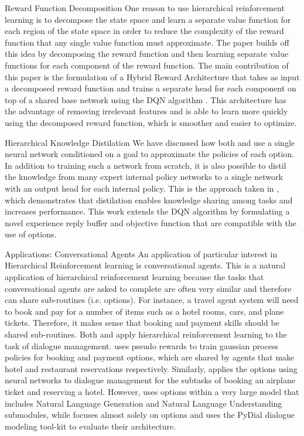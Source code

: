 \begin{subsection}{Reward Function Decomposition}
One reason to use hierarchical reinforcement learning is
to decompose the state space and learn a separate value function
for each region of the state space in order to reduce the complexity of the reward
function that any single value function must approximate. The paper
\cite{Seijen} builds off this idea
by decomposing the reward function and then learning separate value functions for
each component of the reward function. The main contribution of this paper is
the formulation of a Hybrid Reward Architecture that takes as input a decomposed
reward function and trains a separate head for each component on top of a shared base
network using the DQN algorithm \cite{Mnih}. This architecture has the advantage of
removing irrelevant features and is able to learn more quickly using the decomposed
reward function, which is smoother and easier to optimize.
\end{subsection}

\begin{subsection}{Hierarchical Knowledge Distilation}
We have discussed how both \cite{Florensa} and \cite{Tejas}
use a single neural network conditioned on a goal to approximate the policies of each option.
In addition to training such a network from scratch, it is also possible to distil
the knowledge from many expert internal policy networks to a single network with an
output head for each internal policy. This is the approach taken in \cite{Tessler}, which
demonstrates that distilation enables knowledge sharing among tasks and increases performance.
This work extends the DQN algorithm by formulating a novel
experience reply buffer and objective function that are compatible with the use
of options.
\end{subsection}

\begin{subsection}{Applications: Conversational Agents}
An application of particular interest in Hierarchical Reinforcement learning
is conversational agents. This is a natural application of hierarchical
reinforcement learning because the tasks that conversational agents are asked
to complete are often very similar and therefore can share sub-routines
(i.e. options). For instance, a travel agent system will need to book
and pay for a number of items such as a hotel rooms, cars, and plane tickets.
Therefore, it makes sense that booking and payment skills should be shared sub-routines.
Both \cite{Peng} and \cite{Budzianowski} apply hierarchical
reinforcement learning to the task of dialogue management. \cite{Budzianowski}
uses pseudo rewards to train gaussian process policies for booking and payment options,
which are shared by agents that make hotel and restaurant reservations respectively.
Similarly, \cite{Peng} applies the options using neural networks
to dialogue management for the subtasks of booking an airplane ticket and reserving a hotel.
However, \cite{Peng} uses options within a very large model that
includes Natural Language Generation and Natural Language Understanding
submodules, while \cite{Budzianowski} focuses almost solely on options and
uses the PyDial dialogue modeling tool-kit to evaluate their architecture.
\end{subsection}


